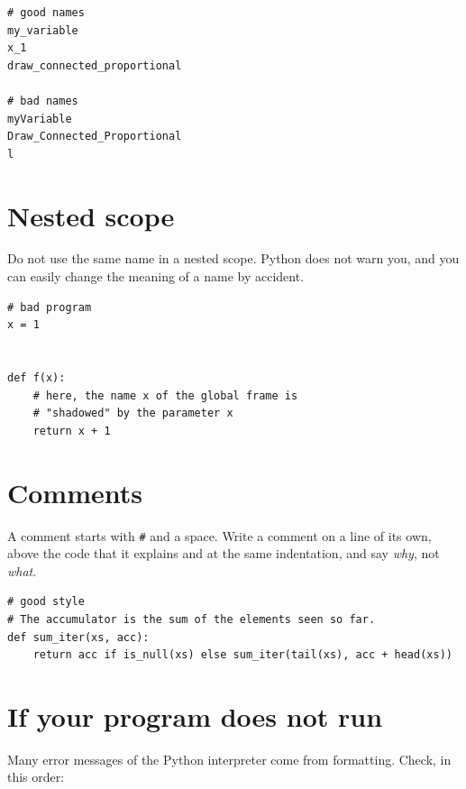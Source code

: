 \begin{lstlisting}
# good names
my_variable
x_1
draw_connected_proportional

# bad names
myVariable
Draw_Connected_Proportional
l
\end{lstlisting}

\section*{Nested scope}

Do not use the same name in a nested scope. Python does not warn you, and you can easily change the
meaning of a name by accident.

\begin{lstlisting}
# bad program
x = 1


def f(x):
    # here, the name x of the global frame is
    # "shadowed" by the parameter x
    return x + 1
\end{lstlisting}

\section*{Comments}

A comment starts with \lstinline{#} and a space. Write a comment on a line of its own, above the
code that it explains and at the same indentation, and say \emph{why}, not \emph{what}.

\begin{lstlisting}
# good style
# The accumulator is the sum of the elements seen so far.
def sum_iter(xs, acc):
    return acc if is_null(xs) else sum_iter(tail(xs), acc + head(xs))
\end{lstlisting}

\section*{If your program does not run}

Many error messages of the Python interpreter come from formatting. Check, in this order:

